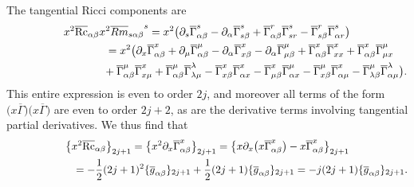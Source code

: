 \documentclass[11pt]{article}
\numberwithin{equation}{section}
\newcommand{\olg}{\overline{g}}
\newcommand{\olGamma}{\overline{\Gamma}}
\DeclareMathOperator{\Rc}{Rc}
\begin{document}
The tangential Ricci components are
\begin{gather*}
x^2 \overline{\Rc}_{\alpha \beta} x^2 {\overline{Rm}_{s \alpha \beta}}^{s}
= x^2 \big( \partial_s \olGamma_{\alpha \beta}^s - \partial_{\alpha} \olGamma_{s \beta}^s + \olGamma_{\alpha \beta}^r \olGamma_{sr}^s - \olGamma_{s \beta}^r \olGamma_{\alpha r}^s \big) \nonumber\\
\hphantom{x^2 \overline{\Rc}_{\alpha \beta} x^2 {\overline{Rm}_{s \alpha \beta}}^{s} }{} = x^2 \big( \partial_x \olGamma_{\alpha \beta}^x + \partial_{\mu} \olGamma_{\alpha \beta}^{\mu} - \partial_{\alpha} \olGamma_{x \beta}^x - \partial_{\alpha} \olGamma_{\mu \beta}^{\mu}
+ \olGamma_{\alpha \beta}^x \olGamma_{xx}^x + \olGamma_{\alpha \beta}^x \olGamma_{\mu x}^{\mu} \nonumber\\
\hphantom{x^2 \overline{\Rc}_{\alpha \beta} x^2 {\overline{Rm}_{s \alpha \beta}}^{s} =}{} + \olGamma_{\alpha \beta}^{\mu} \olGamma_{x\mu}^x + \olGamma_{\alpha \beta}^{\mu} \olGamma_{\lambda \mu}^{\lambda} - \olGamma_{x \beta}^x \olGamma_{\alpha x}^x - \olGamma_{\mu \beta}^x \olGamma_{\alpha x}^{\mu} - \olGamma_{x \beta}^{\mu} \olGamma_{\alpha \mu}^x - \olGamma_{\lambda \beta}^{\mu} \olGamma_{\alpha \mu}^{\lambda} \big).%
\end{gather*}
This entire expression is even to order $2j$, and moreover all terms of the form $\big(x \olGamma\big)\big(x \olGamma\big)$ are even to order $2j+2$, as are the derivative terms involving tangential partial derivatives. We thus find that
\begin{gather}
\big\{ x^2 \overline{\Rc}_{\alpha \beta} \big\}_{2j+1} = \big\{ x^2 \partial_x \olGamma_{\alpha \beta}^x \big\}_{2j+1}
=\big\{ x \partial_x \big( x \olGamma_{\alpha \beta}^x\big) - x \olGamma_{\alpha \beta}^x \big\}_{2j+1}\label{eqA.7}\\
\hphantom{\big\{ x^2 \overline{\Rc}_{\alpha \beta} \big\}_{2j+1}}{}= -\frac{1}{2} (2j+1)^2 \{\olg_{\alpha \beta}\}_{2j+1} + \frac{1}{2} (2j+1) \{\olg_{\alpha \beta}\}_{2j+1}
 = - j (2j+1)\{\olg_{\alpha \beta}\}_{2j+1} .\nonumber
\end{gather}
\end{document}
